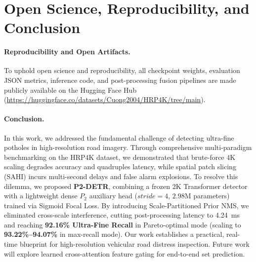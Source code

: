 \documentclass[runningheads]{llncs}
\begin{document}
\section{Open Science, Reproducibility, and Conclusion}

\paragraph{Reproducibility and Open Artifacts.}
To uphold open science and reproducibility, all checkpoint weights, evaluation JSON metrics, inference code, and post-processing fusion pipelines are made publicly available on the Hugging Face Hub (\url{https://huggingface.co/datasets/Cuong2004/HRP4K/tree/main}).

\paragraph{Conclusion.}
In this work, we addressed the fundamental challenge of detecting ultra-fine potholes in high-resolution road imagery. Through comprehensive multi-paradigm benchmarking on the HRP4K dataset, we demonstrated that brute-force 4K scaling degrades accuracy and quadruples latency, while spatial patch slicing (SAHI) incurs multi-second delays and false alarm explosions. To resolve this dilemma, we proposed \textbf{P2-DETR}, combining a frozen 2K Transformer detector with a lightweight dense $P_2$ auxiliary head ($stride=4$, $2.98\text{M}$ parameters) trained via Sigmoid Focal Loss. By introducing Scale-Partitioned Prior NMS, we eliminated cross-scale interference, cutting post-processing latency to 4.24~ms and reaching \textbf{92.16\% Ultra-Fine Recall} in Pareto-optimal mode (scaling to \textbf{93.22\%--94.07\%} in max-recall mode). Our work establishes a practical, real-time blueprint for high-resolution vehicular road distress inspection. Future work will explore learned cross-attention feature gating for end-to-end set prediction.

\let\oldbibliography\thebibliography
\renewcommand{\thebibliography}[1]{%
  \oldbibliography{#1}%
  \setlength{\itemsep}{1.2pt}%
  \setlength{\parskip}{0pt}%
}


\end{document}
